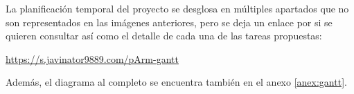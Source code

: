 La planificación temporal del proyecto se desglosa en múltiples apartados que no son
representados en las imágenes anteriores, pero se deja un enlace por si se quieren
consultar así como el detalle de cada una de las tareas propuestas:

\begin{center}
    \url{https://s.javinator9889.com/pArm-gantt} \qquad {}
\end{center}

Además, el diagrama al completo se encuentra también en el anexo \ref{anex:gantt}.
